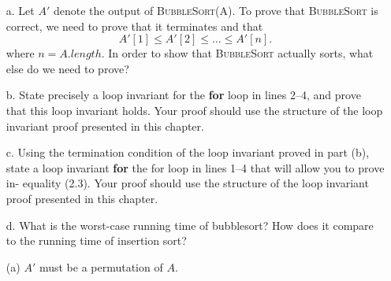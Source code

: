 \begin{enumerate}
{\begin{enumerate}
\item[a.] Let $A'$ denote the output of \textsc{BubbleSort(A)}. To prove that
\textsc{BubbleSort} is correct, we need to prove that it terminates and that
\begin{equation*}
  A'[1] \le A'[2] \le \dots \le A'[n].
\end{equation*}
where $n = A.length$. In order to show that \textsc{BubbleSort} actually sorts,
what else do we need to prove?

\item[b.] State precisely a loop invariant for the \textbf{for} loop in lines
2{--}4, and prove that this loop invariant holds. Your proof should use the
structure of the loop invariant proof presented in this chapter.

\item[c.] Using the termination condition of the loop invariant proved in part
(b), state a loop invariant \textbf{for} the for loop in lines 1{--}4 that will
allow you to prove in- equality (2.3). Your proof should use the structure of
the loop invariant proof presented in this chapter.

\item[d.] What is the worst-case running time of bubblesort? How does it compare
  to the running time of insertion sort?
\end{enumerate}
}

\newpage

\begin{framed}

\begin{enumerate}
\item[(a)] $A'$ must be a permutation of $A$.


\end{enumerate}
\end{framed}
\end{enumerate}
